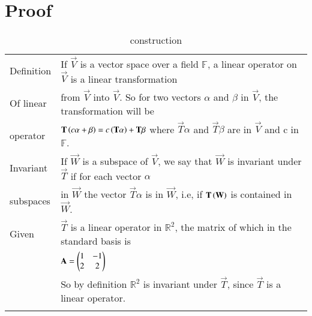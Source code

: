 \documentclass[journal,12pt]{IEEEtran}
\begin{document}
\section{Proof}
\renewcommand{\thetable}{1}
\begin{longtable}{|l|l|}
    \hline
        Definition & If $\vec{V}$ is a vector space over a field $\mathbb{F}$, a linear operator on $\vec{V}$ is a linear transformation \\
        Of linear &from $\vec{V}$ into $\vec{V}$. So for two vectors $\alpha$ and $\beta$ in $\vec{V}$, the transformation will be \\
        operator& $\mathbf{T}\left(c\alpha+\beta\right)=c\left(\mathbf{T}\alpha\right)+\mathbf{T}\beta$ where $\vec{T}\alpha$ and $\vec{T}\beta$ are in $\vec{V}$ and c in $\mathbb{F}$.\\
    \hline
    Invariant &If $\vec{W}$ is a subspace of $\vec{V}$, we say that $\vec{W}$ is invariant under $\vec{T}$ if for each vector $\alpha$\\
    subspaces &in $\vec{W}$ the vector $\vec{T}\alpha$ is in $\vec{W}$, i.e, if $\mathbf{T}\left(\mathbf{W}\right)$ is contained in $\vec{W}$.\\
    \hline
    Given & $\vec{T}$ is a linear operator in $\mathbb{R}^2$, the matrix of which in the standard basis is\\
    & \qquad  \qquad \qquad \qquad \qquad$\mathbf{A}=\begin{pmatrix}1&-1\\2&2\end{pmatrix}$\\
    & So by definition $\mathbb{R}^2$ is invariant under $\vec{T}$, since $\vec{T}$ is a linear operator.\\
    \hline
    \caption{construction}
    \label{tab:construction}
\end{longtable}
\renewcommand{\thetable}{2}
\end{document}
